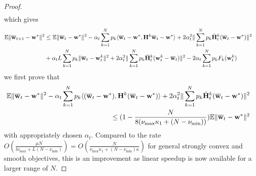 \begin{proof}
\begin{align*}
	\end{align*}
	which gives 
	\begin{align*}
	\mathbb{E}\|{\overline{\mathbf{w}}}_{t+1}-{\mathbf{w}}^{\ast}\|^{2} & \leq\mathbb{E}\|{\overline{\mathbf{w}}}_{t}-{\mathbf{w}}^{\ast}\|^{2}-\alpha_{t}\sum_{k=1}^{N}p_{k}\langle{\overline{\mathbf{w}}}_{t}-{\mathbf{w}}^{\ast},{\mathbf{H}}^{k}{\overline{\mathbf{w}}}_{t}-{\mathbf{w}}^{\ast}\rangle+2\alpha_{t}^{2}\|\sum_{k=1}^{N}p_{k}\tilde{{\mathbf{H}}}_{t}^{k}({\overline{\mathbf{w}}}_{t}-{\mathbf{w}}^{\ast})\|^{2}\\
	& +\alpha_{t}L\sum_{k=1}^{N}p_{k}\|{\overline{\mathbf{w}}}_{t}-{\mathbf{w}}_{t}^{k}\|^{2}+2\alpha_{t}^{2}\|\sum_{k=1}^{N}p_{k}\tilde{{\mathbf{H}}}_{t}^{k}({\mathbf{w}}_{t}^{k}-{\overline{\mathbf{w}}}_{t})\|^{2}-2\alpha_{t}\sum_{k=1}^{N}p_{k}F_{k}({\mathbf{w}}_{t}^{k})
	\end{align*}
	we first prove that 
	\begin{align*}
	\mathbb{E}\|{\overline{\mathbf{w}}}_{t}-{\mathbf{w}}^{\ast}\|^{2}-\alpha_{t}\sum_{k=1}^{N}p_{k}\langle({\overline{\mathbf{w}}}_{t}-{\mathbf{w}}^{\ast}),{\mathbf{H}}^{k}({\overline{\mathbf{w}}}_{t}-{\mathbf{w}}^{\ast})\rangle+2\alpha_{t}^{2}\|\sum_{k=1}^{N}p_{k}\tilde{{\mathbf{H}}}_{t}^{k}({\overline{\mathbf{w}}}_{t}-{\mathbf{w}}^{\ast})\|^{2}\\
	\leq(1-\frac{N}{8(\nu_{\max}\kappa_{1}+(N-\nu_{\min}))})\mathbb{E}\|{\overline{\mathbf{w}}}_{t}-{\mathbf{w}}^{\ast}\|^{2}
	\end{align*}
	with appropriately chosen $\alpha_{t}$. Compared to the rate $O(\frac{\mu N}{l\nu_{\max}+L(N-\nu_{\min})})=O(\frac{N}{\nu_{\max}\kappa_{1}+(N-\nu_{\min})\kappa})$
	for general strongly convex and smooth objectives, this is an improvement
	as linear speedup is now available for a larger range of $N$. 
	

\end{proof}
